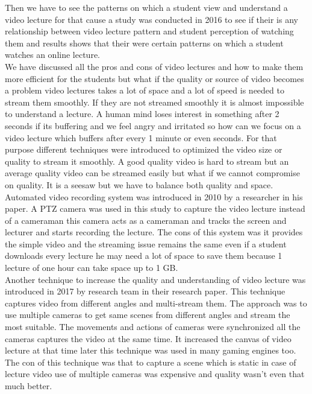 Then we have to see the patterns on which a student view and understand a video lecture for that cause a study was conducted in 2016 to see if their is any relationship between video lecture pattern and student perception of watching them and results shows that their were certain patterns on which a student watches an online lecture.\cite{Giannakos2016}\\
We have discussed all the pros and cons of video lectures and how to make them more efficient for the students but what if the quality or source of video becomes a problem video lectures takes a lot of space and a lot of speed is needed to stream them smoothly. If they are not streamed smoothly it is almost impossible to understand a lecture. A human mind loses interest in something after 2 seconds if its buffering and we feel angry and irritated so how can we focus on a video lecture which buffers after every 1 minute or even seconds. For that purpose different techniques were introduced to optimized the video size or quality to stream it smoothly. A good quality video is hard to stream but an average quality video can be streamed easily but what if we cannot compromise on quality. It is a seesaw but we have to balance both quality and space.\\
Automated video recording system was introduced in 2010 by a researcher in his paper. A PTZ camera was used in this study to capture the video lecture instead of a cameraman this camera acts as a cameraman and tracks the screen and lecturer and starts recording the lecture.\cite{Chou2010} 
The cons of this system was it provides the simple video and the streaming issue remains the same even if a student downloads every lecture he may need a lot of space to save them because 1 lecture of one hour can take space up to 1 GB.\\
Another technique to increase the quality and understanding of video lecture was introduced in 2017 by research team in their research paper. This technique captures video from different angles and multi-stream them. The approach was to use multiple cameras to get same scenes from different angles and stream the most suitable. The movements and actions of cameras were synchronized all the cameras captures the video at the same time. It increased the canvas of video lecture at that time later this technique was used in many gaming engines too. \cite{Carlsson2017} The con of this technique was that to capture a scene which is static in case of lecture video use of multiple cameras was expensive and quality wasn't even that much better.\\
